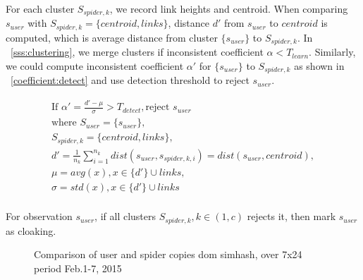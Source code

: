 For each cluster $S_{spider, k}$, we record link heights and centroid.
When comparing $s_{user}$ with $S_{spider, k} = \{centroid, links\}$, 
distance $d'$ from $s_{user}$ to $centroid$ is computed, which is average distance
from cluster $\{s_{user}\}$ to $S_{spider, k}$. In ~\autoref{sss:clustering}, we
merge clusters if inconsistent coefficient $\alpha < T_{learn}$. Similarly, we
could compute inconsistent coefficient $\alpha'$ for $\{s_{user}\}$ to $S_{spider, k}$ as
shown in ~\autoref{coefficient:detect} and use detection threshold to reject
$s_{user}$.

\begin{equation}
  \label{coefficient:detect}
  \begin{gathered}
    \text {If } \alpha' = \frac{d' - \mu}{\sigma} > T_{detect}, \text{reject } s_{user} \\
    \text{where }
    S_{user} = \{s_{user}\}, \\
   S_{spider, k} = \{centroid, links\}, \\
    d' = \frac{1}{n_k}\sum_{i=1}^{n_k} dist(s_{user}, s_{spider, k, i}) =
    dist(s_{user}, centroid), \\ 
    \mu = avg(x), x \in  \{d'\} \cup links, \\
    \sigma = std(x), x \in \{d'\} \cup links \\
  \end{gathered}
\end{equation}

For observation $s_{user}$, if all clusters $S_{spider, k}, k \in (1, c)$ rejects it, then
mark $s_{user}$ as cloaking.

\begin{figure}[t]
  \centering
  \caption{Comparison of user and spider copies dom simhash, over 7x24 period Feb.1-7, 2015}
  \label{fig:google-simhash}
\end{figure}

